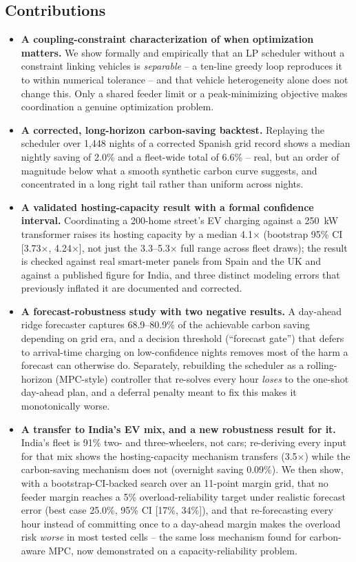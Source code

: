 \documentclass[journal]{IEEEtran}
\begin{document}
\subsection{Contributions}
\begin{itemize}
  \item \textbf{A coupling-constraint characterization of when optimization matters.} We show formally and empirically that an LP scheduler without a constraint linking vehicles is \emph{separable} -- a ten-line greedy loop reproduces it to within numerical tolerance -- and that vehicle heterogeneity alone does not change this. Only a shared feeder limit or a peak-minimizing objective makes coordination a genuine optimization problem.
  \item \textbf{A corrected, long-horizon carbon-saving backtest.} Replaying the scheduler over 1,448 nights of a corrected Spanish grid record shows a median nightly saving of 2.0\% and a fleet-wide total of 6.6\% -- real, but an order of magnitude below what a smooth synthetic carbon curve suggests, and concentrated in a long right tail rather than uniform across nights.
  \item \textbf{A validated hosting-capacity result with a formal confidence interval.} Coordinating a 200-home street's EV charging against a 250~kW transformer raises its hosting capacity by a median 4.1$\times$ (bootstrap 95\% CI [3.73$\times$, 4.24$\times$], not just the 3.3--5.3$\times$ full range across fleet draws); the result is checked against real smart-meter panels from Spain and the UK and against a published figure for India, and three distinct modeling errors that previously inflated it are documented and corrected.
  \item \textbf{A forecast-robustness study with two negative results.} A day-ahead ridge forecaster captures 68.9--80.9\% of the achievable carbon saving depending on grid era, and a decision threshold (``forecast gate'') that defers to arrival-time charging on low-confidence nights removes most of the harm a forecast can otherwise do. Separately, rebuilding the scheduler as a rolling-horizon (MPC-style) controller that re-solves every hour \emph{loses} to the one-shot day-ahead plan, and a deferral penalty meant to fix this makes it monotonically worse.
  \item \textbf{A transfer to India's EV mix, and a new robustness result for it.} India's fleet is 91\% two- and three-wheelers, not cars; re-deriving every input for that mix shows the hosting-capacity mechanism transfers (3.5$\times$) while the carbon-saving mechanism does not (overnight saving 0.09\%). We then show, with a bootstrap-CI-backed search over an 11-point margin grid, that no feeder margin reaches a 5\% overload-reliability target under realistic forecast error (best case 25.0\%, 95\% CI [17\%, 34\%]), and that re-forecasting every hour instead of committing once to a day-ahead margin makes the overload risk \emph{worse} in most tested cells -- the same loss mechanism found for carbon-aware MPC, now demonstrated on a capacity-reliability problem.
\end{itemize}
\end{document}
